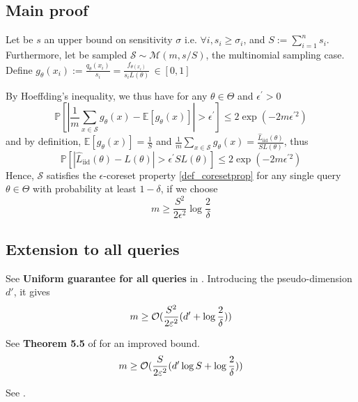\subsection{Main proof}
Let be $s$ an upper bound on sensitivity $\sigma$ i.e. $\forall i, s_i \geq \sigma_i$, and $S := \sum_{i=1}^n s_i$. Furthermore, let be sampled  $\mathcal S \sim \mathcal M(m, s/S)$, the multinomial sampling case. Define $g_\theta(x_i) := \frac{q_\theta(x_i)}{s_i} = \frac{f_{\theta(x_i)}}{s_i L(\theta)}  \, \in[0,1]$

By Hoeffding's inequality, we thus have for any $\theta \in \Theta$ and $\epsilon^{\prime}>0$
\begin{equation}
	\mathbb{P}\left[\left|\frac{1}{m} \sum_{x \in \mathcal{S}} g_{\theta}(x) - \mathbb{E}\left[g_{\theta}(x)\right]\right|>\epsilon^{\prime}\right] \leq 2 \exp \left(-2 m \epsilon^{\prime 2}\right)
\end{equation}
and by definition, $\mathbb{E}\left[g_{\theta}(x)\right]=\frac{1}{S}$ and $\frac{1}{m} \sum_{x \in \mathcal{S}} g_{\theta}(x)=\frac{\hat L_{\textrm{iid}}(\theta)}{S L(\theta)}$, thus
\begin{equation*}
	\mathbb{P}\left[|\hat L_{\textrm{iid}}(\theta) - L(\theta)|>\epsilon^{\prime} S L(\theta)\right] \leq 2 \exp \left(-2 m \epsilon^{\prime 2}\right)
\end{equation*}
Hence, $\mathcal{S}$ satisfies the $\epsilon$-coreset property \ref{def_coresetprop} for any single query $\theta \in \Theta$ with probability at least $1-\delta$, if we choose
\begin{equation}
	m \geq \frac{S^{2}}{2 \epsilon^{2}} \log \frac{2}{\delta}
\end{equation}


\subsection{Extension to all queries}
See \textbf{Uniform guarantee for all queries} in \cite{bachem2017coresetML}. Introducing the pseudo-dimension $d'$, it gives
\begin{equation}
	m \geq \mathcal{O}(\frac{S^{2}}{2 \varepsilon^{2}} (d' + \log \frac{2}{\delta}))
\end{equation}

See \textbf{Theorem 5.5} of \cite{braverman2016coresetsota} for an improved bound.
\begin{equation}
	m \geq \mathcal{O}(\frac{S}{2 \varepsilon^{2}} (d' \log S + \log \frac{2}{\delta}))
\end{equation}

See \cite{bachem2017coresetML}.
